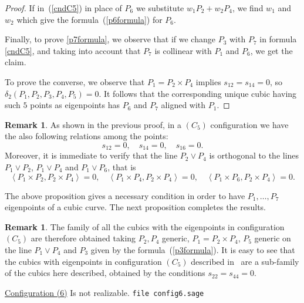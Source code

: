 \documentclass{amsart}
\theoremstyle{plain}
\theoremstyle{definition}
\newtheorem{rmk}[lemma]{Remark}
\newcommand{\scl}[2]{\left\langle {#1}, {#2} \right\rangle}
\begin{document}
\begin{proof}
If in~(\ref{cndC5}) in place of $P_6$ we substitute $w_1P_2+w_2P_4$,
we find $w_1$ and $w_2$ which give the formula~(\ref{p6formula}) for $P_6$.

Finally, to prove \eqref{p7formula}, we observe that if we change $P_3$ with $P_7$ in formula \eqref{cndC5}, and taking into account that $P_7$ is collinear with $P_1$ and $P_6$, we get the claim.




To prove the converse, we observe that $P_1= P_2 \times P_4$ implies
$s_{12}=s_{14}=0$, so $\delta_2 (P_1,P_2,P_3,P_4,P_5)=0$. It follows that the corresponding unique cubic having such $5$ points as eigenpoints has $P_6$ and $P_7$ aligned with $P_1$.
\end{proof}

\begin{rmk}
As shown in the previous proof,
    in a $(C_5)$ configuration we
have the also following relations among the points:
\[
s_{12} = 0, \quad s_{14} = 0, \quad s_{16} = 0.
\]
Moreover, it is
immediate to verify that the line $P_2\vee P_4$ is orthogonal to the
lines $P_1\vee P_2$, $P_1\vee P_4$ and $P_1\vee P_6$, that is
\[
\scl{P_1\times P_2}{P_2\times P_4} = 0, \quad
\scl{P_1\times P_4}{P_2\times P_4} = 0, \quad
\scl{P_1\times P_6}{P_2\times P_4} = 0.
\]
\end{rmk}


The above proposition gives a necessary condition in order to have
$P_1, \dots, P_7$ eigenpoints of a cubic curve. The next proposition
completes the results.

\begin{rmk}
The family of all the cubics with the eigenpoints in configuration $(C_5)$
are therefore obtained taking $P_2, P_4$ generic, $P_1 = P_2 \times P_4$,
$P_5$ generic on the line $P_1\vee P_4$ and $P_3$ given by the
formula~(\ref{p3formula}).
It is easy to see that the cubics with eigenpoints in configuration $(C_5)$
described in~ are a sub-family of the cubics here described,
obtained by the conditions $s_{22} = s_{44} = 0$.
\end{rmk}


\underline{Configuration (6)} Is not realizable.
\verb+file config6.sage+
\end{document}
